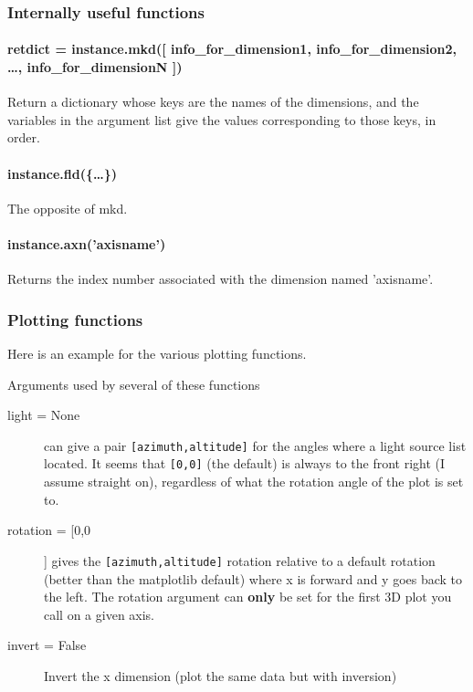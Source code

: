 \subsubsection{Internally useful functions}
\paragraph{retdict = instance.mkd([ info\_for\_dimension1, info\_for\_dimension2, \ldots, info\_for\_dimensionN ])}
Return a dictionary whose keys are the names of the dimensions,
    and the variables in the argument list give the values corresponding
    to those keys, in order.
\paragraph{instance.fld(\{\ldots\})}
The opposite of mkd.
\paragraph{instance.axn('axisname')}
Returns the index number associated with the dimension named 'axisname'.
\subsubsection{Plotting functions}
Here is an example for the various plotting functions.

Arguments used by several of these functions
\begin{mykwargs}
    \begin{description}
        \item[light = None] can give a pair
            \texttt{[azimuth,altitude]} for the angles where
            a light source list located.
            It seems that \texttt{[0,0]} (the default) is always to the front right (I assume straight on), regardless of what the rotation angle of the plot is set to.
        \item[rotation = [0,0]] gives the \texttt{[azimuth,altitude]} rotation relative to a default rotation (better than the matplotlib default) where x is forward and y goes back to the left.
            The rotation argument can \textbf{only} be set for the first 3D plot you call on a given axis.
        \item[invert = False]  Invert the x dimension (\ie plot the same data but with inversion)
    \end{description}
\end{mykwargs}

